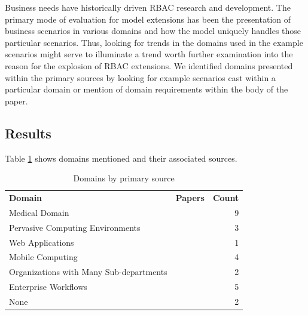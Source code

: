 Business needs have historically driven RBAC research and development.  The primary mode of evaluation for
model extensions has been the presentation of business scenarios in various domains and how the model
uniquely handles those particular scenarios.  Thus, looking for trends in the domains used in the example
scenarios might serve to illuminate a trend worth further examination into the reason for the explosion of
RBAC extensions.  We identified domains presented within the primary sources by looking for example
scenarios cast within a particular domain or mention of domain requirements within the body of the paper.

\subsection{Results}

Table \ref{tab:domains} shows domains mentioned and their associated sources.

\begin{table}
\centering
\caption{Domains by primary source}
\vspace{0.1 in}
\begin{tabular*}{.9\linewidth}{| p{.45\linewidth} | p{.3\linewidth} | r | }
\cline{1-3}

\textbf{Domain} & \textbf{Papers} & \textbf{Count} \\ \cline{1-3}
Medical Domain
&
\cite{ni2010privacy}
\cite{motta03:contextual}
\cite{aich09:role}
\cite{zhou2007team}
\cite{alam06:constraint}
\cite{tzelepi01:flexible}
\cite{damiani2007geo}
\cite{hansen2003spatial}
\cite{samuel07:spatio-temporal}

&
9 \\ \cline{1-3}
Pervasive Computing Environments
& 
\cite{huang06:pervasive}
\cite{ray07:spatio}
\cite{chen08:spatio-temporal}
&
3 \\ \cline{1-3}
Web Applications
&
\cite{haibo05:context} 
\cite{masoumzadeh2008purbac}
&
1 \\ \cline{1-3}
Mobile Computing
&
\cite{aich09:role} 
\cite{thein2011leveraging}
\cite{zou2009crbac}
\cite{ray2006lrbac}
\cite{chandran05:llt}
&
4 \\ \cline{1-3}
Organizations with Many Sub-departments
&
\cite{yao2008task} 
\cite{yamazaki04:designing}
&
2 \\ \cline{1-3}
Enterprise Workflows
&
\cite{cholewka00:acontext-sensitive}
\cite{bao08:role}
\cite{zhang06:collaborative}
\cite{oh2003task}
\cite{joshi05:generalized}
&
5 \\ \cline{1-3}
None
&
\cite{jian2008extended}
\cite{aich07:STARBAC}
&
2 \\ \cline{1-3}

\end{tabular*}
\label{tab:domains}
\end{table}

